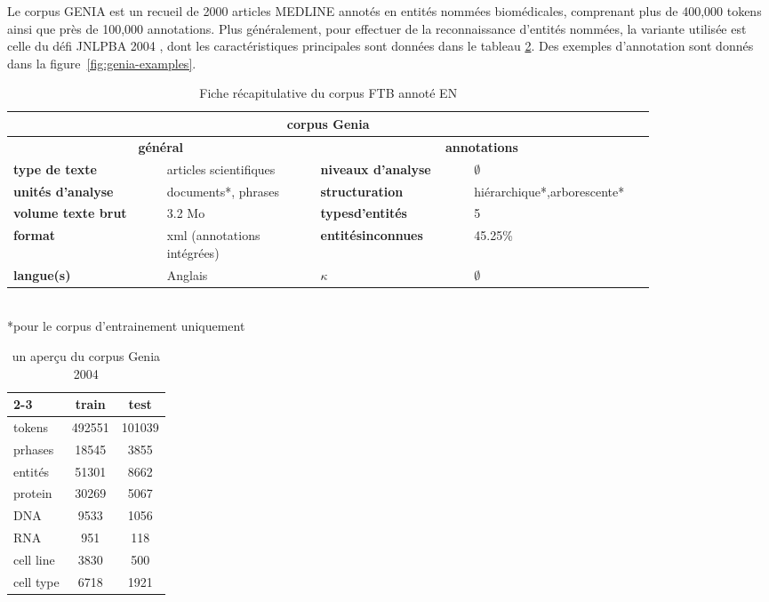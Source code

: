 \documentclass[PhD-Yoann-Dupont.tex]{subfiles}
\begin{document}
Le corpus GENIA \citep{kim2003genia} est un recueil de 2000 articles MEDLINE annotés en entités nommées biomédicales, comprenant plus de 400,000 tokens ainsi que près de 100,000 annotations. Plus généralement, pour effectuer de la reconnaissance d'entités nommées, la variante utilisée est celle du défi JNLPBA 2004 \citep{kim2004introduction}, dont les caractéristiques principales sont données dans le tableau \ref{tab:genia-2004-numbers}. Des exemples d'annotation sont donnés dans la figure\ \ref{fig:genia-examples}.

\begin{table}[ht!]
\centering
\begin{tabular}{|p{0.21\linewidth}|p{0.21\linewidth}|p{0.21\linewidth}|p{0.21\linewidth}|}
\hline
\multicolumn{4}{|c|}{\textbf{corpus Genia}} \\
\hline
\multicolumn{2}{|c|}{\textbf{général}} & \multicolumn{2}{c|}{\textbf{annotations}} \\
\hline
\textbf{type de texte} & articles scientifiques & \textbf{niveaux d'analyse} & $\emptyset$ \\
\hline
\textbf{unités d'analyse} & documents*, phrases & \textbf{structuration} & hiérarchique*,\newline arborescente* \\
\hline
\textbf{volume texte brut} & 3.2 Mo & \textbf{types\newline d'entités} & 5 \\
\hline
\textbf{format} & xml (annotations intégrées) & \textbf{entités\newline inconnues} & 45.25\% \\
\hline
\textbf{langue(s)} & Anglais & \textbf{$\kappa$} & $\emptyset$ \\
\hline
\end{tabular}
\scriptsize{\\ *pour le corpus d'entrainement uniquement}
\caption{Fiche récapitulative du corpus FTB annoté EN}
\label{tab:genia-recap-card}
\end{table}

\begin{table}[ht!]
\centering
\begin{tabular}{|l|cc|}
\cline{2-3}
\multicolumn{1}{l|}{} & train  & test \\
\hline
tokens                & 492551 & 101039 \\
prhases               & 18545  & 3855 \\
entités               & 51301  & 8662 \\
\hline
protein               & 30269  & 5067 \\
DNA                   & 9533   & 1056 \\
RNA                   & 951    & 118 \\
cell line             & 3830   & 500 \\
cell type             & 6718   & 1921 \\
\hline
\end{tabular}
\caption{un aperçu du corpus Genia 2004}
\label{tab:genia-2004-numbers}
\end{table}
\end{document}
